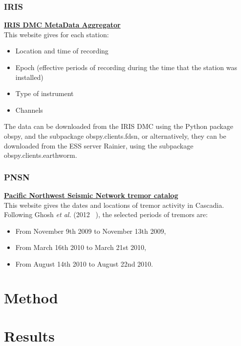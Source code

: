 \documentclass[main.tex]{subfiles}
\begin{document}
\subsection{IRIS}

\href{http://ds.iris.edu/mda}{\textbf{IRIS DMC MetaData Aggregator}} \\

This website gives for each station:
\begin{itemize}
	\item Location and time of recording
	\item Epoch (effective periods of recording during the time that the station was installed)
	\item Type of instrument
	\item Channels
\end{itemize}

The data can be downloaded from the IRIS DMC using the Python package obspy, and the subpackage obspy.clients.fdsn, or alternatively, they can be downloaded from the ESS server Rainier, using the subpackage obspy.clients.earthworm.

\subsection{PNSN}

\href{https://www.pnsn.org/tremor}{\textbf{Pacific Northwest Seismic Network tremor catalog}} \\

This website gives the dates and locations of tremor activity in Cascadia. Following Ghosh \textit{et al.} (2012 ~\cite{GHO_2012}), the selected periods of tremors are:
\begin{itemize}
	\item From November 9th 2009 to November 13th 2009,
	\item From March 16th 2010 to March 21st 2010,
	\item From August 14th 2010 to August 22nd 2010.
\end{itemize}

\chapter{Method}

\chapter{Results}
\end{document}
